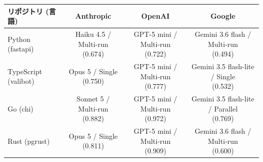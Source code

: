 \begin{tabular}{lccc}
\toprule
リポジトリ (言語) & Anthropic & OpenAI & Google \\
\midrule
Python (fastapi) & \shortstack{Haiku 4.5 / Multi-run \\ (0.674)} & \shortstack{GPT-5 mini / Multi-run \\ (0.722)} & \shortstack{Gemini 3.6 flash / Multi-run \\ (0.494)} \\
TypeScript (valibot) & \shortstack{Opus 5 / Single \\ (0.750)} & \shortstack{GPT-5 mini / Multi-run \\ (0.777)} & \shortstack{Gemini 3.5 flash-lite / Single \\ (0.532)} \\
Go (chi) & \shortstack{Sonnet 5 / Multi-run \\ (0.882)} & \shortstack{GPT-5 mini / Multi-run \\ (0.972)} & \shortstack{Gemini 3.5 flash-lite / Parallel \\ (0.769)} \\
Rust (pgrust) & \shortstack{Opus 5 / Single \\ (0.811)} & \shortstack{GPT-5 mini / Multi-run \\ (0.909)} & \shortstack{Gemini 3.6 flash / Multi-run \\ (0.600)} \\
\bottomrule
\end{tabular}

